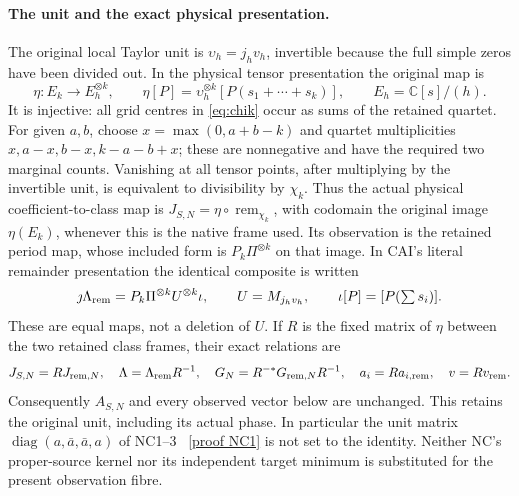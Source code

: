 \documentclass[11pt]{article}
\newcommand{\C}{\mathbb C}
\newcommand{\remm}{\operatorname{rem}}
\begin{document}
\paragraph{The unit and the exact physical presentation.}
The original local Taylor unit is $\upsilon_h=j_hv_h$, invertible
because the full simple zeros have been divided out.  In the physical
tensor presentation the original map is
\[
 \eta:E_k\longrightarrow E_h^{\otimes k},\qquad
 \eta[P]=\upsilon_h^{\otimes k}[P(s_1+\cdots+s_k)],
 \qquad E_h=\C[s]/(h).
\]
It is injective: all grid centres in \eqref{eq:chik} occur as sums of
the retained quartet.  For given $a,b$, choose $x=\max(0,a+b-k)$
and quartet multiplicities $x,a-x,b-x,k-a-b+x$; these are nonnegative
and have the required two marginal counts.  Vanishing at all tensor
points, after multiplying
by the invertible unit, is equivalent to divisibility by $\chi_k$.
Thus the actual physical coefficient-to-class map is
$J_{S,N}=\eta\circ\remm_{\chi_k}$, with codomain the original image
$\eta(E_k)$, whenever this is the native frame used.  Its observation
is the retained period map, whose included form is
$P_k\Pi^{\otimes k}$ on that image.  In CAI's literal remainder
presentation the identical composite is written
\[
 \jmath\Lambda_{\rm rem}
 =P_k\Pi^{\otimes k}U^{\otimes k}\iota,
 \qquad U=M_{j_hv_h},\qquad \iota[P]=[P(\textstyle\sum s_i)].
\]
These are equal maps, not a deletion of $U$.  If $R$ is the fixed
matrix of $\eta$ between the two retained class frames, their exact
relations are
\begin{equation}\label{eq:unitframe}
 J_{S,N}=R J_{{\rm rem},N},\quad
 \Lambda=\Lambda_{\rm rem}R^{-1},\quad
 G_N=R^{-*}G_{{\rm rem},N}R^{-1},\quad
 a_i=R a_{i,\rm rem},\quad v=Rv_{\rm rem}.
\end{equation}
Consequently $A_{S,N}$ and every observed vector below are unchanged.
This retains the original unit, including its actual phase.  In
particular the unit matrix $\operatorname{diag}(a,\bar a,\bar a,a)$
of NC1--3 \cite{NC}%
~\href{https://github.com/KokunoYumeto/zeta-function-research-reader/blob/5992ad50c0f2a06921f1fcaded7b4e38097c0739/workbenches/splitzero-tandem/continuations/20260920-original-kernel-mixed-determinants/providers/ORIGINAL_CONDUCTOR_COPRIMALITY.tex\#L41}{[proof NC1]}%
{} is not set to the identity.  Neither NC's
proper-source kernel nor its independent target minimum is substituted
for the present observation fibre.
\end{document}

